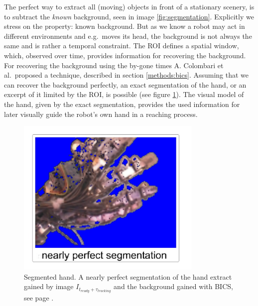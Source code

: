 \documentclass[conference]{IEEEtran}
\begin{document}
The perfect way to extract all (moving) objects in front of a stationary scenery, is to subtract the \textit{known} background, seen in image \ref{fig:segmentation}. Explicitly we stress on the property: known background. But as we know a robot may act in different environments and e.g.\ moves its head, the background is not always the same and is rather a temporal constraint. The ROI defines a spatial window, which, observed over time, provides information for recovering the background. For recovering the background using the by-gone times A. Colombari et al.\ proposed a technique, described in section \ref{methods:bics}. Assuming that we can recover the background perfectly, an exact segmentation of the hand, or an excerpt of it limited by the ROI, is possible (see figure \ref{fig:perfsegm}). The visual model of the hand, given by the exact segmentation, provides the used information for later visually guide the robot's own hand in a reaching process.
%
\begin{figure}[h]
	\begin{center}
		\includegraphics[width=3.5in]{imgs/method/perfsegm.pdf}
	\end{center}
		\caption[Segmented hand. ]{Segmented hand. A nearly perfect segmentation of the hand extract gained by image $I_{t_{ready}+\tau_{tracking}}$ and the background gained with BICS, see page \pageref{methods:bics}.}
		\label{fig:perfsegm}
\end{figure}
%
\end{document}
